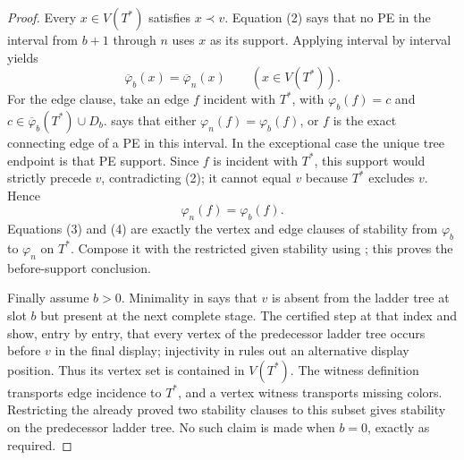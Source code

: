 \begin{proof}
Every \(x\in V(T^*)\) satisfies \(x\prec v\).  Equation (2) says that no PE
in the interval from \(b+1\) through \(n\) uses \(x\) as its support.
Applying  interval by interval yields
\[
 \overline\varphi_b(x)=\overline\varphi_n(x)
 \qquad(x\in V(T^*)).                                         \tag{3}
\]
For the edge clause, take an edge \(f\) incident with \(T^*\), with
\(\varphi_b(f)=c\) and
\(c\in\overline\varphi_b(T^*)\cup D_b\).
 says that either
\(\varphi_n(f)=\varphi_b(f)\), or \(f\) is the exact connecting edge of a
PE in this interval.  In the exceptional case the unique tree endpoint is
that PE support.  Since \(f\) is incident with \(T^*\), this support would
strictly precede \(v\), contradicting (2); it cannot equal \(v\) because
\(T^*\) excludes \(v\).  Hence
\[
 \varphi_n(f)=\varphi_b(f).                                    \tag{4}
\]
Equations (3) and (4) are exactly the vertex and edge clauses of stability
from \(\varphi_b\) to \(\varphi_n\) on \(T^*\).  Compose it with the
restricted given stability using ; this proves the
before-support conclusion.

Finally assume \(b>0\).  Minimality in
 says that \(v\) is absent from the ladder
tree at slot \(b\) but present at the next complete stage.  The certified
step at that index and  show, entry by
entry, that every vertex of the predecessor ladder tree occurs before
\(v\) in the final display; injectivity in  rules out
an alternative display position.  Thus its vertex set is contained in
\(V(T^*)\).  The witness definition  transports
edge incidence to \(T^*\), and a vertex witness transports missing colors.
Restricting the already proved two stability clauses to this subset gives
stability on the predecessor ladder tree.  No such claim is made when
\(b=0\), exactly as required.
\end{proof}
